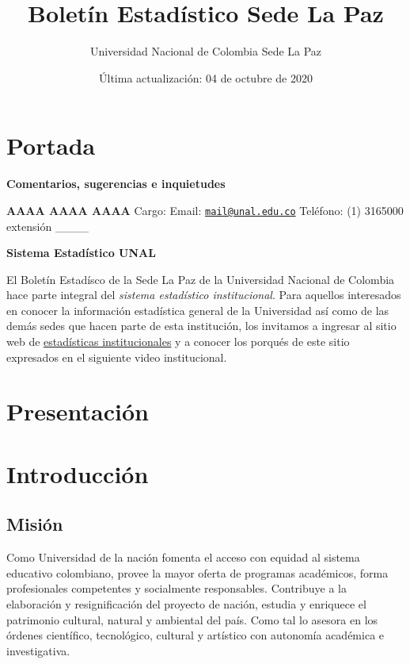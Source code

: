 \documentclass[
]{book}
\title{Boletín Estadístico Sede La Paz}
\author{ Universidad Nacional de Colombia Sede La Paz}
\date{Última actualización: 04 de octubre de 2020}
\begin{document}
\maketitle

{
\setcounter{tocdepth}{1}
\tableofcontents
}
\hypertarget{portada}{%
\chapter*{Portada}\label{portada}}

\textbf{Comentarios, sugerencias e inquietudes}

\textbf{AAAA AAAA AAAA}
Cargo:
Email: \href{mailto:mail@unal.edu.co}{\nolinkurl{mail@unal.edu.co}}
Teléfono: (1) 3165000 extensión \_\_\_\_

\textbf{Sistema Estadístico UNAL}

El Boletín Estadísco de la Sede La Paz de la Universidad Nacional de Colombia hace parte integral del \emph{sistema estadístico institucional}. Para aquellos interesados en conocer la información estadística general de la Universidad así como de las demás sedes que hacen parte de esta institución, los invitamos a ingresar al sitio web de \href{http://estadisticas.unal.edu.co/home/}{estadísticas institucionales} y a conocer los porqués de este sitio expresados en el siguiente video institucional.

\hypertarget{Presenta}{%
\chapter*{Presentación}\label{Presenta}}

\hypertarget{intro}{%
\chapter*{Introducción}\label{intro}}

\hypertarget{mision}{%
\section*{Misión}\label{mision}}

Como Universidad de la nación fomenta el acceso con equidad al sistema educativo colombiano, provee la mayor oferta de programas académicos, forma profesionales competentes y socialmente responsables. Contribuye a la elaboración y resignificación del proyecto de nación, estudia y enriquece el patrimonio cultural, natural y ambiental del país. Como tal lo asesora en los órdenes científico, tecnológico, cultural y artístico con autonomía académica e investigativa.
\end{document}
